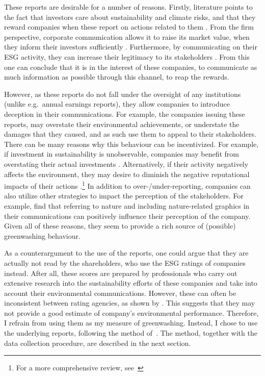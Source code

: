 \documentclass[12pt]{article}
\begin{document}
These reports are desirable for a number of reasons. Firstly, literature points to the fact that investors care about sustainability and climate risks, and that they reward companies when these report on actions related to them \parencite{ilhanClimateRiskDisclosure2023,kruegerImportanceClimateRisks2020,pastorSustainableInvestingEquilibrium2021,testaDoesItPay2018}. From the firm perspective, corporate communication allows it to raise its market value, when they inform their investors sufficiently \parencite{servaesImpactCorporateSocial2013}. Furthermore, by communicating on their ESG activity, they can increase their legitimacy to its stakeholders \parencite{torelliGreenwashingEnvironmentalCommunication2020}. From this one can conclude that it is in the interest of these companies, to communicate as much information as possible through this channel, to reap the rewards. 

However, as these reports do not fall under the oversight of any institutions (unlike e.g.~annual earnings reports), they allow companies to introduce deception in their communications. For example, the companies issuing these reports, may overstate their environmental achievements, or understate the damages that they caused, and as such use them to appeal to their stakeholders. There can be many reasons why this behaviour can be incentivized. For example, if investment in sustainability is unobservable, companies may benefit from overstating their actual investments \parencite{wuBadGreenwashingGood2020}. Alternatively, if their activity negatively affects the environment, they may desire to diminish the negative reputational impacts of their actions \parencite{marquisScrutinyNormsSelective2016, binglerCheapTalkCherrypicking2022}.\footnote{For a more comprehensive review, see~\cite{kimGreenwashVsBrownwash2015}} In addition to over-/under-reporting, companies can also utilize other strategies to impact the perception of the stakeholders. For example, \textcite{parguelCanEvokingNature2015,schmuckMisleadingConsumersGreen2018} find that referring to nature and including nature-related graphics in their communications can positively influence their perception of the company. Given all of these reasons, they seem to provide a rich source of (possible) greenwashing behaviour.


As a counterargument to the use of the reports, one could argue that they are actually not read by the shareholders, who use the ESG ratings of companies instead. After all, these scores are prepared by professionals who carry out extensive research into the sustainability efforts of these companies and take into account their environmental communications. However, these can often be inconsistent between rating agencies, as shown by \textcite{bergAggregateConfusionDivergence2022, chatterjiRatingsFirmsConverge2016}. This suggests that they may not provide a good estimate of company's environmental performance. Therefore, I refrain from using them as my measure of greenwashing. Instead, I chose to use the underlying reports, following the method of~\cite{binglerHowCheapTalk2024}. The method, together with the data collection procedure, are described in the next section.
\end{document}
